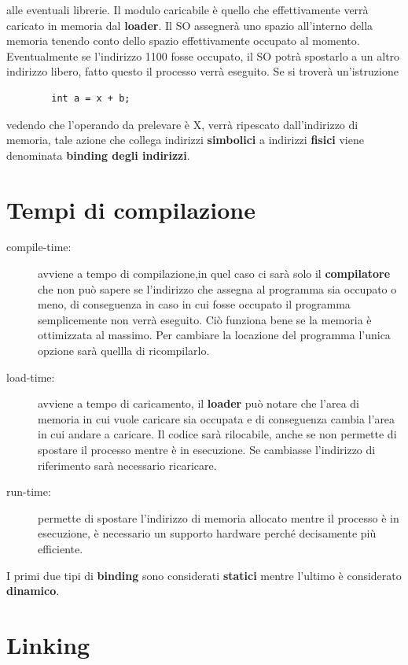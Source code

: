 \documentclass[a4paper, 12pt]{book}
\begin{document}
alle eventuali librerie. Il modulo caricabile è quello che effettivamente verrà caricato in memoria dal \textbf{loader}. Il SO
assegnerà uno spazio all'interno della memoria tenendo conto dello spazio effettivamente occupato al momento. Eventualmente se
l'indirizzo 1100 fosse occupato, il SO potrà spostarlo a un altro indirizzo libero, fatto questo il processo verrà eseguito.
Se si troverà un'istruzione 
\begin{center}
    \begin{verbatim}
        int a = x + b;
    \end{verbatim}
\end{center}
vedendo che l'operando da prelevare è X, verrà ripescato dall'indirizzo di memoria, tale azione che collega indirizzi 
\textbf{simbolici} a indirizzi \textbf{fisici} viene denominata \textbf{binding degli indirizzi}.
\section{Tempi di compilazione}
\begin{description}
    \item[compile-time:] avviene a tempo di compilazione,in quel caso ci sarà solo il 
    \textbf{compilatore} che non può sapere se l'indirizzo che assegna al programma sia occupato o meno, di conseguenza 
    in caso in cui fosse occupato il programma semplicemente non verrà eseguito. Ciò funziona bene se la memoria è ottimizzata
    al massimo. Per cambiare la locazione del programma l'unica opzione sarà quellla di ricompilarlo.
    \item[load-time:]avviene a tempo di caricamento, il \textbf{loader} può notare che l'area di memoria in cui vuole
    caricare sia occupata e di conseguenza cambia l'area in cui andare a caricare. Il codice sarà rilocabile, anche se non permette
    di spostare il processo mentre è in esecuzione. Se cambiasse l'indirizzo di riferimento sarà necessario ricaricare.
    \item[run-time:]permette di spostare l'indirizzo di memoria allocato mentre il processo è in esecuzione, è necessario un 
    supporto hardware perché decisamente più efficiente. 
\end{description}
I primi due tipi di \textbf{binding} sono considerati \textbf{statici} mentre l'ultimo è considerato \textbf{dinamico}.

\section{Linking}
\end{document}
